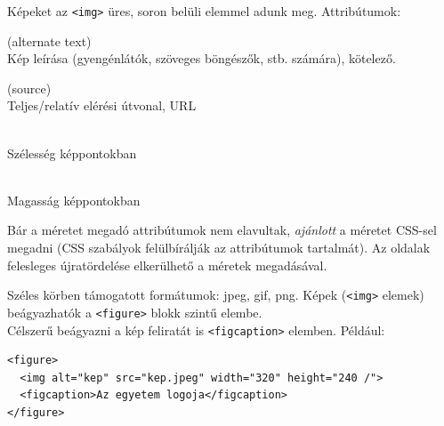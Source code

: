 \begin{frame}
  Képeket az \texttt{<img>} üres, soron belüli elemmel adunk meg. Attribútumok:
  \begin{description}[m]
    \item[\texttt{alt}] (alternate text) \hfill \\ Kép leírása (gyengénlátók, szöveges böngészők, stb. számára), kötelező.
    \item[\texttt{src}] (source) \hfill \\ Teljes/relatív elérési útvonal, URL
    \item[\texttt{width}] \hfill \\ Szélesség képpontokban
    \item[\texttt{height}] \hfill \\ Magasság képpontokban
  \end{description}
  Bár a méretet megadó attribútumok nem elavultak, \emph{ajánlott} a méretet CSS-sel megadni (CSS szabályok felülbírálják az attribútumok tartalmát). Az oldalak felesleges újratördelése elkerülhető a méretek megadásával.
\end{frame}

\begin{frame}[fragile]
  Széles körben támogatott formátumok: jpeg, gif, png.
  \vfill
  Képek (\texttt{<img>} elemek) beágyazhatók a \texttt{<figure>} blokk szintű elembe.\\
  Célszerű beágyazni a kép feliratát is \texttt{<figcaption>} elemben.
  \vfill
  Például:
  \begin{verbatim}
<figure>
  <img alt="kep" src="kep.jpeg" width="320" height="240 /">
  <figcaption>Az egyetem logoja</figcaption>
</figure>
  \end{verbatim}
\end{frame}

